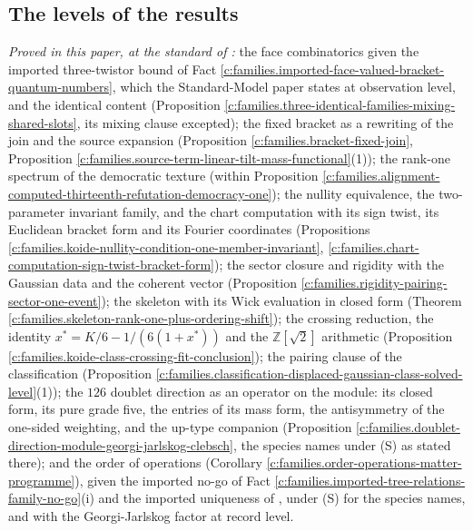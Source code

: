 \documentclass[11pt]{article}
\theoremstyle{definition}
\theoremstyle{plain}
\begin{document}
\subsection*{The levels of the results}
\label{c:note.families.setting-levels-results}
\emph{Proved in this paper, at the standard of \cite{ButlerT1}:} the face combinatorics given the imported three-twistor bound of Fact \ref{c:families.imported-face-valued-bracket-quantum-numbers}, which the Standard-Model paper states at observation level, and the identical content (Proposition \ref{c:families.three-identical-families-mixing-shared-slots}, its mixing clause excepted); the fixed bracket as a rewriting of the join and the source expansion (Proposition \ref{c:families.bracket-fixed-join}, Proposition \ref{c:families.source-term-linear-tilt-mass-functional}(1)); the rank-one spectrum of the democratic texture (within Proposition \ref{c:families.alignment-computed-thirteenth-refutation-democracy-one}); the nullity equivalence, the two-parameter invariant family, and the chart computation with its sign twist, its Euclidean bracket form and its Fourier coordinates (Propositions \ref{c:families.koide-nullity-condition-one-member-invariant}, \ref{c:families.chart-computation-sign-twist-bracket-form}); the sector closure and rigidity with the Gaussian data and the coherent vector (Proposition \ref{c:families.rigidity-pairing-sector-one-event}); the skeleton with its Wick evaluation in closed form (Theorem \ref{c:families.skeleton-rank-one-plus-ordering-shift}); the crossing reduction, the identity $x^{*} = K/6 - 1/(6(1+x^{*}))$ and the $\mathbb{Z}[\sqrt{2}]$ arithmetic (Proposition \ref{c:families.koide-class-crossing-fit-conclusion}); the pairing clause of the classification (Proposition \ref{c:families.classification-displaced-gaussian-class-solved-level}(1)); the $126$ doublet direction as an operator on the module: its closed form, its pure grade five, the entries of its mass form, the antisymmetry of the one-sided weighting, and the up-type companion (Proposition \ref{c:families.doublet-direction-module-georgi-jarlskog-clebsch}, the species names under (S) as stated there); and the order of operations (Corollary \ref{c:families.order-operations-matter-programme}), given the imported no-go of Fact \ref{c:families.imported-tree-relations-family-no-go}(i) and the imported uniqueness of \cite[Prop.~9.32]{ButlerT12}, under (S) for the species names, and with the Georgi-Jarlskog factor at record level.
\end{document}
